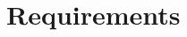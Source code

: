 \documentclass[12pt]{article}
\newcommand{\aref}[1]{A\ref{#1}}
\begin{document}





\newpage
\section{Requirements}

\end{document}
